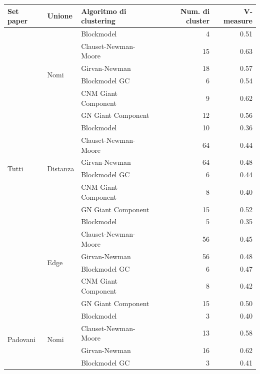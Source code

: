 \documentclass[12pt,a4paper,twoside]{report}
\begin{document}
{
    \footnotesize
\begin{center}
\label{tab:valorivmeasure}
\begin{longtable}{ |l|l|l|r|r| }
    \hline
        Set paper & Unione & Algoritmo di clustering & Num. di cluster & V-measure \\
    \hline
        \multirow{18}{4em}{Tutti}
        &
        \multirow{6}{4em}{Nomi}
        &Blockmodel  &4&0.51\\
        &&Clauset-Newman-Moore&15&0.63\\
        &&Girvan-Newman  &18&0.57\\
        &&Blockmodel GC  &6&0.54\\
        &&CNM Giant Component  &9&0.62\\
        &&GN Giant Component  &12&0.56\\
    \cline{2-5}
        &
        \multirow{6}{4em}{Distanza}
        &Blockmodel &10&0.36\\
        &&Clauset-Newman-Moore &64&0.44\\
        &&Girvan-Newman &64 &0.48\\
        &&Blockmodel GC  &6&0.44\\
        &&CNM Giant Component  &8&0.40\\
        &&GN Giant Component  &15&0.52\\
    \cline{2-5}
        &
        \multirow{6}{4em}{Edge}
        &Blockmodel &5&0.35\\
        &&Clauset-Newman-Moore &56&0.45\\
        &&Girvan-Newman &56&0.48\\
        &&Blockmodel GC  &6&0.47\\
        &&CNM Giant Component  &8&0.42\\
        &&GN Giant Component  &15&0.50\\
    \cline{1-5}
        \multirow{18}{4em}{Padovani}
        &
        \multirow{6}{4em}{Nomi}
        &Blockmodel &3&0.40\\
        &&Clauset-Newman-Moore &13&0.58\\
        &&Girvan-Newman &16&0.62\\
        &&Blockmodel GC  &3&0.41\\

\end{longtable}
\end{center}}
\end{document}
